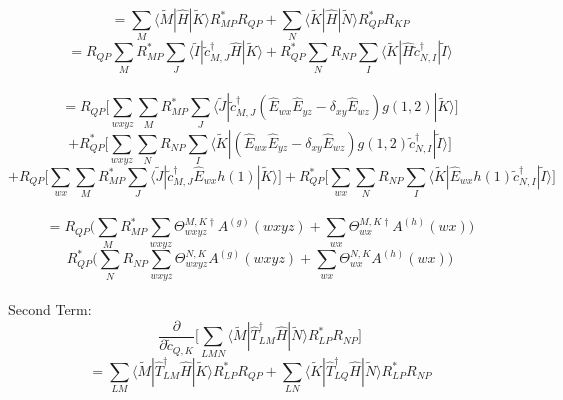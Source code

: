\documentclass[12pt]{article}
\begin{document}
\begin{equation*}
= \sum_{M}\langle \tilde{M}|\hat{H}|\tilde{K}\rangle R_{MP}^{*}R_{QP}
+ \sum_{N}\langle \tilde{K}|\hat{H}|\tilde{N}\rangle R_{QP}^{*}R_{KP}
\end{equation*}
\begin{equation*}
= R_{QP}    \sum_{M}R_{MP}^{*}\sum_{J}\langle \tilde{I}|\tilde{c}_{M,J}^{\dagger}\hat{H}|\tilde{K}\rangle
+ R_{QP}^{*}\sum_{N}R_{NP}    \sum_{I}\langle \tilde{K}|\hat{H}\tilde{c}_{N,I}^{\dagger}|\tilde{I}\rangle
\end{equation*}
\\
\begin{equation*}
= R_{QP}    \Bigg[\sum_{wxyz} \sum_{M}R_{MP}^{*}\sum_{J}\langle \tilde{J}|\tilde{c}_{M,J}^{\dagger}(\hat{E}_{wx}\hat{E}_{yz}-\delta_{xy}\hat{E}_{wz})g(1,2)|\tilde{K}\rangle\Bigg]
\end{equation*}
\begin{equation*}
+R_{QP}^{*}\Bigg[\sum_{wxyz} \sum_{N}R_{NP}    \sum_{I}\langle \tilde{K}|(\hat{E}_{wx}\hat{E}_{yz}-\delta_{xy}\hat{E}_{wz})g(1,2)\tilde{c}_{N,I}^{\dagger}|\tilde{I}\rangle\Bigg]
\end{equation*}
\begin{equation*}
+R_{QP}    \Bigg[\sum_{wx} \sum_{M}R_{MP}^{*}\sum_{J}\langle \tilde{J}|\tilde{c}_{M,J}^{\dagger}\hat{E}_{wx}h(1)|\tilde{K}\rangle\Bigg]
+R_{QP}^{*}\Bigg[\sum_{wx} \sum_{N}R_{NP}    \sum_{I}\langle \tilde{K}|\hat{E}_{wx}h(1)\tilde{c}_{N,I}^{\dagger}|\tilde{I}\rangle\Bigg]
\end{equation*}
\\
\begin{equation*}
= R_{QP}    \Bigg(\sum_{M}R_{MP}^{*}\sum_{wxyz}\Theta^{M,K\dagger}_{wxyz}A^{(g)}(wxyz) +\sum_{wx}\Theta^{M,K\dagger}_{wx}A^{(h)}(wx)\Bigg)
\end{equation*}
\begin{equation}
  R_{QP}^{*}\Bigg( \sum_{N}R_{NP}    \sum_{wxyz}\Theta^{N,K}_{wxyz}A^{(g)}(wxyz) +\sum_{wx}\Theta^{N,K}_{wx}A^{(h)}(wx) \Bigg)
\end{equation}
\\
Second Term:
\begin{equation}
 \frac{\partial}{\partial \tilde{c}_{Q,K}}\Bigg[
\sum_{LMN}\langle\tilde{M}|\hat{T}_{LM}^{\dagger}\hat{H}|\tilde{N}\rangle R^{*}_{LP}R_{NP}
\Bigg]
\end{equation}
\begin{equation*}
=\sum_{LM}\langle\tilde{M}|\hat{T}_{LM}^{\dagger}\hat{H}|\tilde{K}\rangle R^{*}_{LP}R_{QP}
+\sum_{LN}\langle\tilde{K}|\hat{T}_{LQ}^{\dagger}\hat{H}|\tilde{N}\rangle R^{*}_{LP}R_{NP}
\end{equation*}
\end{document}
